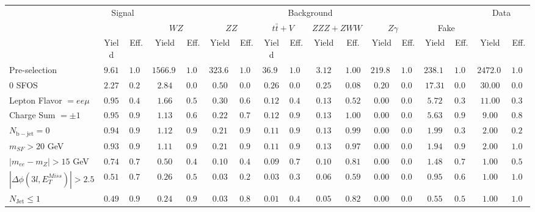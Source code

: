 \begin{tabular}{l||c|c||c|c||c|c||c|c||c|c||c|c||c|c||c|c}
\hline
 &                 \multicolumn{2}{c||}{Signal}            &  \multicolumn{12}{c||}{Background} &  \multicolumn{2}{c}{Data} \\
 & &  & \multicolumn{2}{c||}{$WZ$} & \multicolumn{2}{c||}{$ZZ$} & \multicolumn{2}{c||}{$t\bar{t}+V$} & \multicolumn{2}{c||}{$ZZZ+ZWW$} & \multicolumn{2}{c||}{$Z\gamma$} & \multicolumn{2}{c||}{Fake} &  & \\ 
 & Yield & Eff. & Yield & Eff. & Yield & Eff. & Yield & Eff. & Yield & Eff. & Yield & Eff. & Yield & Eff. & Yield & Eff.\\
\hline\hline
Pre-selection &  $9.61$ &  $1.00$ &  $1566.90$ &  $1.00$ &  $323.60$ &  $1.00$ &  $36.93$ &  $1.00$ &  $3.12$ &  $1.00$ &  $219.80$ &  $1.00$ &  $238.12$ &  $1.00$ &  $2472.00$ &  $1.00$\\ 
\hline
0 SFOS &  $2.27$ &  $0.24$ &  $2.84$ &  $0.00$ &  $0.50$ &  $0.00$ &  $0.26$ &  $0.01$ &  $0.25$ &  $0.08$ &  $0.20$ &  $0.00$ &  $17.31$ &  $0.07$ &  $30.00$ &  $0.01$\\ 
\hline
Lepton Flavor $= ee\mu$ &  $0.95$ &  $0.42$ &  $1.66$ &  $0.59$ &  $0.30$ &  $0.60$ &  $0.12$ &  $0.45$ &  $0.13$ &  $0.52$ &  $0.00$ &  $0.00$ &  $5.72$ &  $0.33$ &  $11.00$ &  $0.37$\\ 
\hline
Charge Sum $= \pm 1$ &  $0.95$ &  $0.99$ &  $1.13$ &  $0.68$ &  $0.22$ &  $0.72$ &  $0.12$ &  $0.99$ &  $0.13$ &  $1.00$ &  $0.00$ &  $0.00$ &  $5.63$ &  $0.98$ &  $9.00$ &  $0.82$\\ 
\hline
$N_{\mathrm{b-jet}} = 0$ &  $0.94$ &  $0.99$ &  $1.12$ &  $0.99$ &  $0.21$ &  $0.99$ &  $0.11$ &  $0.98$ &  $0.13$ &  $0.99$ &  $0.00$ &  $0.00$ &  $1.99$ &  $0.35$ &  $2.00$ &  $0.22$\\ 
\hline
$m_{SF} > 20$ GeV &  $0.93$ &  $0.99$ &  $1.11$ &  $0.99$ &  $0.21$ &  $0.98$ &  $0.11$ &  $0.98$ &  $0.13$ &  $0.97$ &  $0.00$ &  $0.00$ &  $1.94$ &  $0.98$ &  $2.00$ &  $1.00$\\ 
\hline
$|m_{ee} - m_{Z}| > 15$ GeV &  $0.74$ &  $0.79$ &  $0.50$ &  $0.45$ &  $0.10$ &  $0.49$ &  $0.09$ &  $0.79$ &  $0.10$ &  $0.81$ &  $0.00$ &  $0.00$ &  $1.48$ &  $0.76$ &  $1.00$ &  $0.50$\\ 
\hline
$|\Delta\phi(3l,E_{T}^{Miss})| > 2.5$ &  $0.51$ &  $0.70$ &  $0.26$ &  $0.52$ &  $0.03$ &  $0.29$ &  $0.03$ &  $0.36$ &  $0.06$ &  $0.59$ &  $0.00$ &  $0.00$ &  $0.95$ &  $0.64$ &  $1.00$ &  $1.00$\\ 
\hline
$N_{\mathrm{Jet}} \leq 1$ &  $0.49$ &  $0.95$ &  $0.24$ &  $0.95$ &  $0.03$ &  $0.87$ &  $0.01$ &  $0.47$ &  $0.05$ &  $0.82$ &  $0.00$ &  $0.00$ &  $0.55$ &  $0.58$ &  $1.00$ &  $1.00$\\ 
\hline
\end{tabular}
